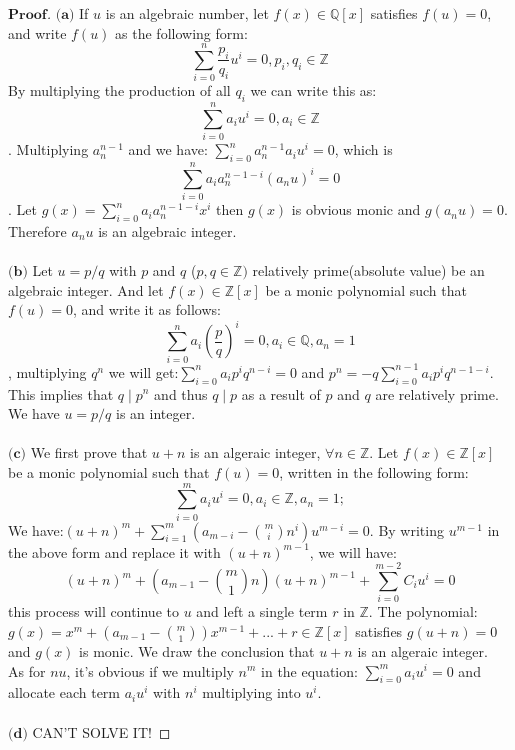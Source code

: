 \documentclass[a4paper, 11pt]{article}
\newenvironment{myprf}
{\renewcommand\qedsymbol{$ $}\begin{proof}[$\mathbf{Proof}$]}
  {\end{proof}}
\begin{document}
 \begin{myprf}
         $\textbf{(a)}$ If $u$ is an algebraic number, let $f(x)\in \mathbb{Q}[x]$ satisfies $f(u)=0$, and write
         $f(u)$ as the following form:
         $$
         \sum_{i=0}^{n}\frac{p_i}{q_i}u^i=0, p_i,q_i\in \mathbb{Z}
         $$ By multiplying the production of all $q_i$ we can write this as:
         $$
         \sum_{i=0}^{n}a_i u^i=0, a_i\in \mathbb{Z}
         $$. Multiplying $a_n^{n-1}$ and we have: $\displaystyle \sum_{i=0}^{n}a_n^{n-1}a_iu^i=0$, which is
         $$
         \sum_{i=0}^{n}a_ia_n^{n-1-i}(a_nu)^i=0
         $$. Let $\displaystyle g(x)=\sum_{i=0}^{n}a_ia_n^{n-1-i}x^i$ then $g(x)$ is obvious monic and $g(a_nu)=0$. Therefore 
         $a_nu$ is an algebraic integer.\\
         \vspace{0.2cm}
         \\
         $\textbf{(b)}$ Let $u=p/q$ with $p$ and $q$ ($p,q\in \mathbb{Z})$
         relatively prime(absolute value) be an algebraic integer. And let $f(x)\in \mathbb{Z}[x]$ be a monic
         polynomial such that $f(u)=0$, and write it as follows:
           $$
           \sum_{i=0}^{n}a_i(\frac{p}{q})^i=0, a_i\in \mathbb{Q}, a_n=1
           $$, multiplying $q^n$ we will get:$\displaystyle \sum_{i=0}^{n}a_ip^iq^{n-i}=0$ and $\displaystyle
           p^n=-q\sum_{i=0}^{n-1}a_ip^iq^{n-1-i}$.  This implies that $q\mid p^n$ and thus $q\mid p$ as a result
           of $p$ and $q$ are relatively prime. We have $u=p/q$ is an integer.\\
           \vspace{0.2cm}
           \\
           $\textbf{(c)}$ We first prove that $u+n$ is an algeraic integer, $\forall n\in \mathbb{Z}$. 
           Let $f(x) \in \mathbb{Z}[x]$ be a monic polynomial such that $f(u)=0$, written in the following 
           form:
           $$
           \sum_{i=0}^{m}a_iu^i=0, a_i\in \mathbb{Z}, a_n=1;
           $$ We have:$\displaystyle (u+n)^m+\sum_{i=1}^{m}(a_{m-i}-{{m}\choose{i}}n^i)u^{m-i}=0$. By writing 
           $u^{m-1}$ in the above form and replace it with $(u+n)^{m-1}$, we will have:
           $$
           (u+n)^{m}+(a_{m-1}-{{m}\choose{1}}n)(u+n)^{m-1}+\sum_{i=0}^{m-2}C_iu^i = 0
           $$ this process will continue to $u$ and left a single term $r$ in $\mathbb{Z}$. The polynomial:
           $\displaystyle g(x)=x^m+(a_{m-1}-{{m}\choose{1}})x^{m-1} +...+ r\in \mathbb{Z}[x]$ 
           satisfies $g(u+n)=0$ and $g(x)$ is monic. We draw the conclusion that $u+n$ is an algeraic integer.\\
           As for $nu$, it's obvious if we multiply $n^m$ in the equation: $\displaystyle \sum_{i=0}^{m}a_iu^i=0$
           and allocate each term $a_i u^i$ with $n^i$ multiplying into $u^i$.\\
           \vspace{0.2cm}
           \\
           $\textbf{(d)}$ CAN'T SOLVE IT!

 \end{myprf}
 
\end{document}
